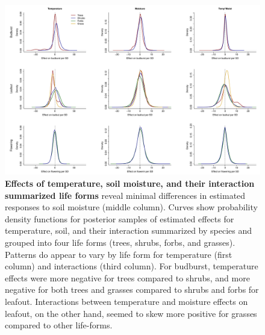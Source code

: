 \documentclass{article}
\begin{document}
\begin{figure}[h]
\centering
 \includegraphics{../../Analyses/soilmoisture/figures/curvebbloflform_widexaxis.pdf}
  \caption{\textbf{Effects of temperature, soil moisture, and their interaction summarized life forms} reveal minimal differences in estimated responses to soil moisture (middle column). Curves show probability density functions for posterior samples of estimated effects for temperature, soil, and their interaction summarized by species and grouped into four life forms (trees, shrubs, forbs, and grasses). Patterns do appear to vary by life form for temperature (first column) and interactions (third column).  For budburst, temperature effects were more negative for trees compared to shrubs, and more negative for both trees and grasses compared to shrubs and forbs for leafout. Interactions between temperature and moisture effects on leafout, on the other hand, seemed to skew more positive for grasses compared to other life-forms.}
 \label{fig:forms}
 \end{figure}
\end{document}
